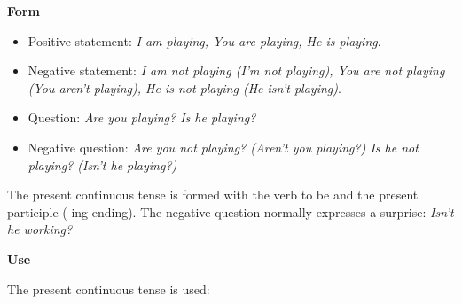 \textbf{Form}

\begin{itemize}

\item Positive statement: \textit{I am playing, You are playing, He is playing}.
\item Negative statement: \textit{I am not playing (I'm not playing), You are not playing (You aren't playing), He is not playing (He isn't playing)}.
\item Question: \textit{Are you playing? Is he playing?}
\item Negative question: \textit{Are you not playing? (Aren't you playing?) Is he not playing? (Isn't he playing?)}

\end{itemize}

The present continuous tense is formed with the verb to be and the present participle (-ing ending). The negative question normally expresses a surprise: \textit{Isn't he working?}

\textbf{Use}

The present continuous tense is used:

